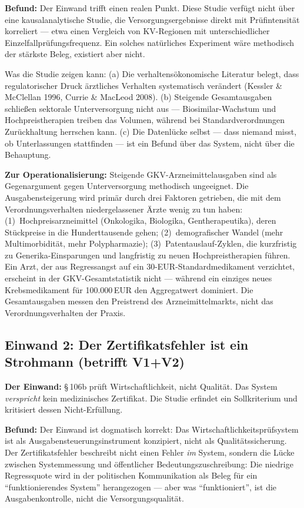 \documentclass{umbruch-position}
\begin{document}
\textbf{Befund:} Der Einwand trifft einen realen Punkt. Diese Studie verfügt nicht über eine kausalanalytische Studie, die Versorgungsergebnisse direkt mit Prüfintensität korreliert --- etwa einen Vergleich von KV-Regionen mit unterschiedlicher Einzelfallprüfungsfrequenz. Ein solches natürliches Experiment wäre methodisch der stärkste Beleg, existiert aber nicht.

Was die Studie zeigen kann: (a) Die verhaltensökonomische Literatur belegt, dass regulatorischer Druck ärztliches Verhalten systematisch verändert (Kessler \& McClellan 1996, Currie \& MacLeod 2008). (b) Steigende Gesamtausgaben schließen sektorale Unterversorgung nicht aus --- Biosimilar-Wachstum und Hochpreistherapien treiben das Volumen, während bei Standardverordnungen Zurückhaltung herrschen kann. (c) Die Datenlücke selbst --- dass niemand misst, ob Unterlassungen stattfinden --- ist ein Befund über das System, nicht über die Behauptung.

\textbf{Zur Operationalisierung:} Steigende GKV-Arzneimittelausgaben sind als Gegenargument gegen Unterversorgung methodisch ungeeignet. Die Ausgabensteigerung wird primär durch drei Faktoren getrieben, die mit dem Verordnungsverhalten niedergelassener Ärzte wenig zu tun haben: (1)~Hochpreisarzneimittel (Onkologika, Biologika, Gentherapeutika), deren Stückpreise in die Hunderttausende gehen; (2)~demografischer Wandel (mehr Multimorbidität, mehr Polypharmazie); (3)~Patentauslauf-Zyklen, die kurzfristig zu Generika-Einsparungen und langfristig zu neuen Hochpreistherapien führen. Ein Arzt, der aus Regressangst auf ein 30-EUR-Standardmedikament verzichtet, erscheint in der GKV-Gesamtstatistik nicht --- während ein einziges neues Krebsmedikament für 100.000\,EUR den Aggregatwert dominiert. Die Gesamtausgaben messen den Preistrend des Arzneimittelmarkts, nicht das Verordnungsverhalten der Praxis.

\subsection{Einwand 2: Der Zertifikatsfehler ist ein Strohmann (betrifft V1+V2)}

\textbf{Der Einwand:} \S\,106b prüft Wirtschaftlichkeit, nicht Qualität. Das System \textit{verspricht} kein medizinisches Zertifikat. Die Studie erfindet ein Sollkriterium und kritisiert dessen Nicht-Erfüllung.

\textbf{Befund:} Der Einwand ist dogmatisch korrekt: Das Wirtschaftlichkeitsprüfsystem ist als Ausgabensteuerungsinstrument konzipiert, nicht als Qualitätssicherung. Der Zertifikatsfehler beschreibt nicht einen Fehler \textit{im} System, sondern die Lücke zwischen Systemmessung und öffentlicher Bedeutungszuschreibung: Die niedrige Regressquote wird in der politischen Kommunikation als Beleg für ein ``funktionierendes System'' herangezogen --- aber was ``funktioniert'', ist die Ausgabenkontrolle, nicht die Versorgungsqualität.
\end{document}
